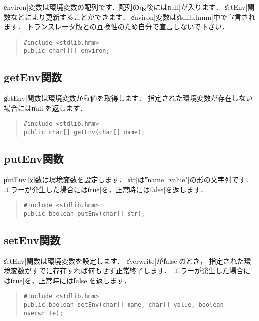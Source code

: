 \|environ|変数は環境変数の配列です．配列の最後には\|null|が入ります．
\|setEnv|関数などにより更新することができます．
\|environ|変数は\|stdlib.hmm|中で宣言されます．
トランスレータ版との互換性のため自分で宣言しないで下さい．

\begin{quote}
\begin{verbatim}
#include <stdlib.hmm>
public char[][] environ;
\end{verbatim}
\end{quote}

\subsection{getEnv関数}

\|getEnv|関数は環境変数から値を取得します．
指定された環境変数が存在しない場合には\|null|を返します．

\begin{quote}
\begin{verbatim}
#include <stdlib.hmm>
public char[] getEnv(char[] name);
\end{verbatim}
\end{quote}

\subsection{putEnv関数}

\|putEnv|関数は環境変数を設定します．
\|str|は\|"name=value"|の形の文字列です．
エラーが発生した場合には\|true|を，正常時には\|false|を返します．

\begin{quote}
\begin{verbatim}
#include <stdlib.hmm>
public boolean putEnv(char[] str);
\end{verbatim}
\end{quote}

\subsection{setEnv関数}

\|setEnv|関数は環境変数を設定します．
\|overwrite|が\|false|のとき，
指定された環境変数がすでに存在すれば何もせず正常終了します．
エラーが発生した場合には\|true|を，正常時には\|false|を返します．

\begin{quote}
\begin{verbatim}
#include <stdlib.hmm>
public boolean setEnv(char[] name, char[] value, boolean overwrite);
\end{verbatim}
\end{quote}

